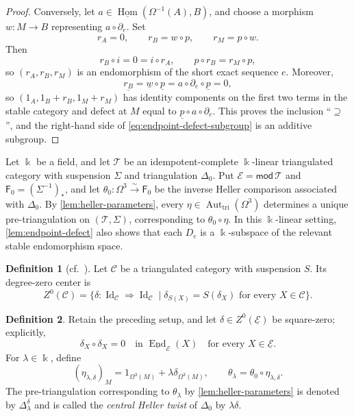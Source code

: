 \documentclass[a4paper,11pt,reqno]{amsart}
\theoremstyle{definition}
\newtheorem{definition}[definition]{Definition}
\theoremstyle{plain}
\numberwithin{equation}{section}
\newcommand{\T}{\mathcal T}
\newcommand{\Hom}{\operatorname{Hom}}
\newcommand{\End}{\operatorname{End}}
\newcommand{\kk}{\Bbbk}
\begin{document}
\begin{proof}
Conversely, let
\(a\in\underline{\Hom}(\Omega^{-1}(A),B)\), and choose a morphism
\(w:M\to B\) representing \(a\circ\partial_e\).  Set
\[
 r_A=0,
 \qquad r_B=w\circ p,
 \qquad r_M=p\circ w.
\]
Then
\[
 r_B\circ i=0=i\circ r_A,
 \qquad
 p\circ r_B=r_M\circ p,
\]
so \((r_A,r_B,r_M)\) is an endomorphism of the short exact sequence
\(e\).  Moreover,
\[
 \underline{r_B}
 =\underline w\circ\underline p
 =a\circ\partial_e\circ\underline p=0,
\]
so \((1_A,1_B+r_B,1_M+r_M)\) has identity components on the first two
terms in the stable category and defect at \(M\) equal to
\(\underline p\circ a\circ\partial_e\).  This proves the inclusion
``\(\supseteq\)'', and the right-hand side of
\eqref{eq:endpoint-defect-subgroup} is an additive subgroup.
\end{proof}

Let \(\kk\) be a field, and let \(\T\) be an idempotent-complete
\(\kk\)-linear triangulated category with suspension \(\Sigma\) and
triangulation \(\Delta_0\).  Put
\(\mathcal E=\mathsf{mod}\,\T\) and
\(\mathsf F_0=(\Sigma^{-1})_*\), and let
\(\theta_0:\Omega^3\xrightarrow{\sim}\mathsf F_0\) be the inverse Heller
comparison associated with \(\Delta_0\).  By
\cref{lem:heller-parameters}, every
\(\eta\in\operatorname{Aut}_{\mathrm{tri}}(\Omega^3)\) determines a
unique pre-triangulation on \((\T,\Sigma)\), corresponding to
\(\theta_0\circ\eta\).  In this \(\kk\)-linear setting,
\cref{lem:endpoint-defect} also shows that each \(D_e\) is a
\(\kk\)-subspace of the relevant stable endomorphism space.

\begin{definition}[{\normalfont cf.~\cite[Definition~2.1]{KrauseYe2011}}]
\label{def:degree-zero-center}
Let \(\mathcal C\) be a triangulated category with suspension \(S\).  Its
degree-zero center is
\[
 Z^0(\mathcal C)=
 \bigl\{\delta:\operatorname{Id}_{\mathcal C}\Rightarrow
 \operatorname{Id}_{\mathcal C}
 \mid
 \delta_{S(X)}=S(\delta_X)\text{ for every }X\in\mathcal C
 \bigr\}.
\]
\end{definition}

\begin{definition}
\label{def:central-twist}
Retain the preceding setup, and let
\(\delta\in Z^0(\underline{\mathcal E})\) be square-zero; explicitly,
\begin{equation}
\label{eq:stable-square-zero}
 \delta_X\circ\delta_X=0
 \quad\text{in }\underline{\End}_{\mathcal E}(X)
 \quad\text{for every }X\in\underline{\mathcal E}.
\end{equation}
For \(\lambda\in\kk\), define
\begin{equation}
\label{eq:central-heller-comparison}
 (\eta_{\lambda,\delta})_M
 =1_{\Omega^3(M)}+\lambda\delta_{\Omega^3(M)},
 \qquad
 \theta_\lambda=\theta_0\circ\eta_{\lambda,\delta}.
\end{equation}
The pre-triangulation corresponding to \(\theta_\lambda\) by
\cref{lem:heller-parameters} is denoted by
\(\Delta_\lambda^\delta\) and is called the \emph{central Heller twist}
of \(\Delta_0\) by \(\lambda\delta\).
\end{definition}
\end{document}
